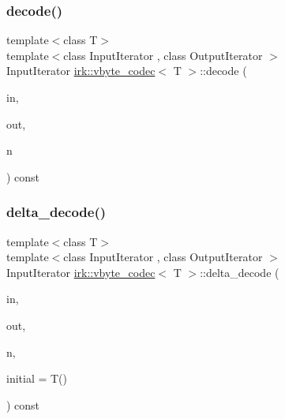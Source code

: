 \mbox{\label{structirk_1_1vbyte__codec_ac294eeea42950c214f56dc03953a3420}} 
\subsubsection{\texorpdfstring{decode()}{decode()}\hspace{0.1cm}{\footnotesize\ttfamily [2/2]}}
{\footnotesize\ttfamily template$<$class T$>$ \\
template$<$class Input\+Iterator , class Output\+Iterator $>$ \\
Input\+Iterator \mbox{\hyperlink{structirk_1_1vbyte__codec}{irk\+::vbyte\+\_\+codec}}$<$ T $>$\+::decode (\begin{DoxyParamCaption}\item[{Input\+Iterator}]{in,  }\item[{Output\+Iterator}]{out,  }\item[{int}]{n }\end{DoxyParamCaption}) const\hspace{0.3cm}{\ttfamily [inline]}}

\mbox{\label{structirk_1_1vbyte__codec_ad0773adf36a31bc8ad7cf98baf6f7721}} 
\subsubsection{\texorpdfstring{delta\+\_\+decode()}{delta\_decode()}}
{\footnotesize\ttfamily template$<$class T$>$ \\
template$<$class Input\+Iterator , class Output\+Iterator $>$ \\
Input\+Iterator \mbox{\hyperlink{structirk_1_1vbyte__codec}{irk\+::vbyte\+\_\+codec}}$<$ T $>$\+::delta\+\_\+decode (\begin{DoxyParamCaption}\item[{Input\+Iterator}]{in,  }\item[{Output\+Iterator}]{out,  }\item[{int}]{n,  }\item[{T}]{initial = {\ttfamily T()} }\end{DoxyParamCaption}) const\hspace{0.3cm}{\ttfamily [inline]}}

